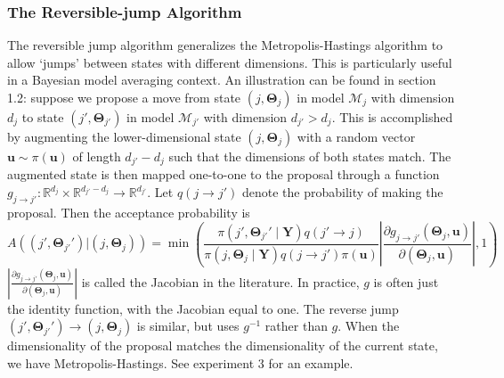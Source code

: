 \documentclass[a4paper,11pt]{article}
\begin{document}
\subsubsection{The Reversible-jump Algorithm}
The reversible jump algorithm \cite{green_reversible_1995} generalizes the Metropolis-Hastings algorithm to allow `jumps' between states with different dimensions. This is particularly useful in a Bayesian model averaging context. An illustration can be found in \cite{brooks_handbook_2011} section 1.2: suppose we propose a move from state $(j, \mathbf{\Theta}_{j})$ in model $\mathcal{M}_{j}$ with dimension $d_{j}$ to state $(j', \mathbf{\Theta}_{j'})$ in model $\mathcal{M}_{j'}$ with dimension $d_{j'}>d_{j}$. This is accomplished by augmenting the lower-dimensional state $(j, \mathbf{\Theta}_{j})$ with a random vector $\mathbf{u} \sim \pi(\mathbf{u})$ of length $d_{j'}-d_{j}$ such that the dimensions of both states match. The augmented state is then mapped one-to-one to the proposal through a function $g_{j \rightarrow j'}: \mathbb{R}^{d_{j}} \times \mathbb{R}^{d_{j'}-d_{j}} \rightarrow \mathbb{R}^{d_{j'}}$. Let $q(j \rightarrow j')$ denote the probability of making the proposal. Then the acceptance probability is
$$
A((j', \mathbf{\Theta}_{j'}')|(j, \mathbf{\Theta}_{j}))=\min \left( \frac{\pi(j', \mathbf{\Theta}_{j'}' \mid \mathbf{Y}) q(j' \rightarrow j)}{\pi(j, \mathbf{\Theta}_{j} \mid \mathbf{Y}) q(j \rightarrow j') \pi(\mathbf{u})}\left|\frac{\partial g_{j \rightarrow j'}(\mathbf{\Theta}_{j}, \mathbf{u})}{\partial(\mathbf{\Theta}_{j}, \mathbf{u})}\right|, 1\right)
$$
$\left|\frac{\partial g_{j \rightarrow j'}(\mathbf{\Theta}_{j}, \mathbf{u})}{\partial(\mathbf{\Theta}_{j}, \mathbf{u})}\right|$ is called the Jacobian in the literature. In practice, $g$ is often just the identity function, with the Jacobian equal to one. The reverse jump $(j', \mathbf{\Theta}_{j'}') \rightarrow (j, \mathbf{\Theta}_{j})$ is similar, but uses $g^{-1}$ rather than $g$. When the dimensionality of the proposal matches the dimensionality of the current state, we have Metropolis-Hastings. See experiment 3 for an example.
\end{document}
